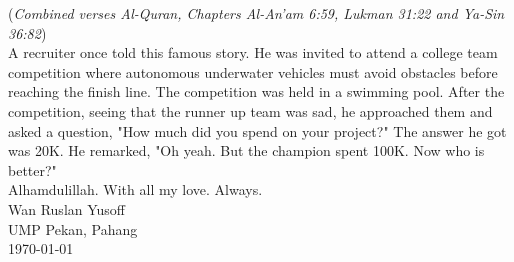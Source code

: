 \begin{singlespace}
\noindent
(\textit{Combined verses Al-Quran, Chapters Al-An'am 6:59, Lukman 31:22 and Ya-Sin 36:82})\\
	

\noindent
A recruiter once told this famous story. He was invited to attend a college team competition where autonomous underwater vehicles must avoid obstacles before reaching the finish line. The competition was held in a swimming pool. After the competition, seeing that the runner up team was sad, he approached them and asked a question, "How much did you spend on your project?" The answer he got was 20K. He remarked, "Oh yeah. But the champion spent 100K. Now who is better?" \\

\noindent
Alhamdulillah. With all my love. Always.\\

\noindent
Wan Ruslan Yusoff\\
UMP Pekan, Pahang\\
\today \\
\end{singlespace}

